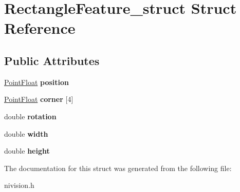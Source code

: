 \hypertarget{structRectangleFeature__struct}{
\section{RectangleFeature\_\-struct Struct Reference}
\label{structRectangleFeature__struct}
}
\subsection*{Public Attributes}
\begin{DoxyCompactItemize}
\item 
\hypertarget{structRectangleFeature__struct_aaf7a612cba18d3a08d5479596c95f1b9}{
\hyperlink{structPointFloat__struct}{PointFloat} {\bfseries position}}
\label{structRectangleFeature__struct_aaf7a612cba18d3a08d5479596c95f1b9}

\item 
\hypertarget{structRectangleFeature__struct_adbde3a8265db2632c14dd5644b13973f}{
\hyperlink{structPointFloat__struct}{PointFloat} {\bfseries corner} \mbox{[}4\mbox{]}}
\label{structRectangleFeature__struct_adbde3a8265db2632c14dd5644b13973f}

\item 
\hypertarget{structRectangleFeature__struct_af49b58aab4d972f394d2b6f8fbc95d70}{
double {\bfseries rotation}}
\label{structRectangleFeature__struct_af49b58aab4d972f394d2b6f8fbc95d70}

\item 
\hypertarget{structRectangleFeature__struct_ad6f9ffb1e271b08fc3ecf31cde63aebb}{
double {\bfseries width}}
\label{structRectangleFeature__struct_ad6f9ffb1e271b08fc3ecf31cde63aebb}

\item 
\hypertarget{structRectangleFeature__struct_aac1ca7f5d51454be3d14f7af1fb7a4a8}{
double {\bfseries height}}
\label{structRectangleFeature__struct_aac1ca7f5d51454be3d14f7af1fb7a4a8}

\end{DoxyCompactItemize}


The documentation for this struct was generated from the following file:\begin{DoxyCompactItemize}
\item 
nivision.h\end{DoxyCompactItemize}
